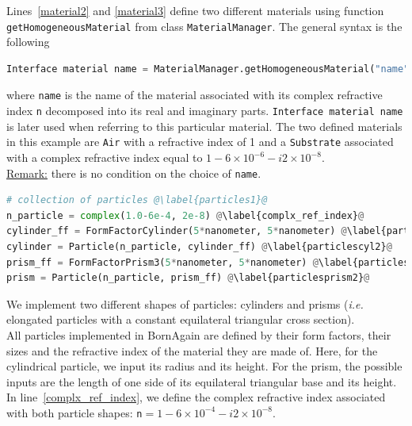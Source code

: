 \noindent Lines~\ref{material2} and \ref{material3} define two different
materials using function \texttt{getHomogeneousMaterial} from class
\texttt{MaterialManager}. The general syntax is the following 

\begin{lstlisting}[language=python, style=eclipse,numbers=none]
Interface material name = MaterialManager.getHomogeneousMaterial("name", Re(n), Im(n))
\end{lstlisting}

\noindent where \texttt{name} is the name of the
material associated with its complex refractive index
\texttt{n} decomposed into its real and imaginary parts. \texttt{Interface material name} is later used when
referring to this particular material. The two defined materials in this example are \texttt{Air} with a refractive
index of 1 and a \texttt{Substrate} associated with a complex refractive index
equal to $1-6\times 10^{-6} -i2\times 10^{-8} $. \\

\noindent \underline{Remark:} there is no condition on the choice of
\texttt{name}. 


\begin{lstlisting}[language=python,
  style=eclipseboxed,name=ex1,nolol]
# collection of particles @\label{particles1}@
n_particle = complex(1.0-6e-4, 2e-8) @\label{complx_ref_index}@
cylinder_ff = FormFactorCylinder(5*nanometer, 5*nanometer) @\label{particlescyl1}@
cylinder = Particle(n_particle, cylinder_ff) @\label{particlescyl2}@
prism_ff = FormFactorPrism3(5*nanometer, 5*nanometer) @\label{particlesprism1}@
prism = Particle(n_particle, prism_ff) @\label{particlesprism2}@
\end{lstlisting}

 \noindent We implement two different shapes of particles: cylinders and
 prisms (\textit{i.e.} elongated particles with a constant equilateral triangular cross section).\\ All particles implemented in BornAgain are defined by their
 form factors, their sizes and the refractive index of the material
  they are made of. Here, for the
  cylindrical particle, we input its radius and its height.  For the prism, 
  the possible inputs are the length of one side of its equilateral triangular
  base and its height.\\

\noindent In line~\ref{complx_ref_index}, we define the complex refractive index
associated with both particle shapes: \texttt{n}$=1-6\times 10^{-4}-i2\times 10^{-8}$.\\
  

